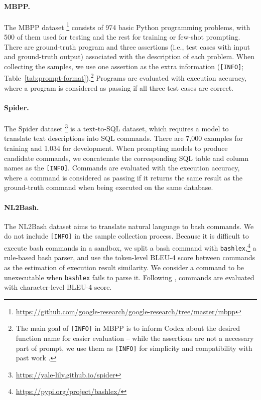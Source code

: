 \documentclass[11pt]{article}
\begin{document}
\paragraph{MBPP.} 
The MBPP dataset \citep{austin2021program}\footnote{
    \url{https://github.com/google-research/google-research/tree/master/mbpp}
} 
consists of 974 basic Python programming problems, with 500 of them used for testing and the rest for training or few-shot prompting. There are ground-truth program and three assertions (i.e., test cases with input and ground-truth output) associated with the description of each problem. When collecting the samples, we use one assertion as the extra information (\texttt{[INFO]}; Table~\ref{tab:prompt-format}).\footnote{The main goal of \texttt{[INFO]} in MBPP is to inform Codex about the desired function name for easier evaluation -- while the assertions are not a necessary part of prompt, we use them as \texttt{[INFO]} for simplicity and compatibility with past work \citep{austin2021program}. } Programs are evaluated with execution accuracy, where a program is considered as passing if all three test cases are correct.

\paragraph{Spider.}
The Spider dataset \citep{yu-etal-2018-spider}\footnote{\url{https://yale-lily.github.io/spider}} is a text-to-SQL dataset, which requires a model to translate text descriptions into SQL commands. There are 7,000 examples for training and 1,034 for development. When prompting models to produce candidate commands, we concatenate the corresponding SQL table and column names as the \texttt{[INFO]}. Commands are evaluated with the execution accuracy, where a command is considered as passing if it returns the same result as the ground-truth command when being executed on the same database.

\paragraph{NL2Bash.} 
The NL2Bash dataset \citep{lin-etal-2018-nl2bash} aims to translate natural language to bash commands. We do not include \texttt{[INFO]} in the sample collection process. Because it is difficult to execute bash commands in a sandbox, we split a bash command with \texttt{bashlex},\footnote{\url{https://pypi.org/project/bashlex/}} a rule-based bash parser, and use the token-level BLEU-4 score between commands as the estimation of execution result similarity. We consider a command to be unexecutable when \texttt{bashlex} fails to parse it. Following \citet{lin-etal-2018-nl2bash}, commands are evaluated with character-level BLEU-4 score.
\end{document}
